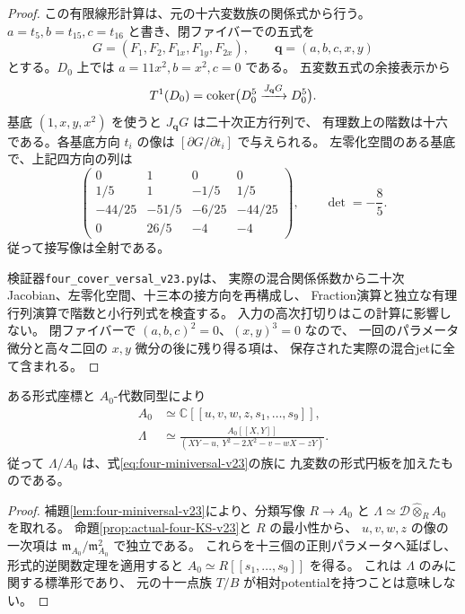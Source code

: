 \begin{proof}
この有限線形計算は、元の十六変数族の関係式から行う。
$a=t_5,b=t_{15},c=t_{16}$ と書き、閉ファイバーでの五式を
\[
 G=(F_1,F_2,F_{1x},F_{1y},F_{2x}),\qquad
 \mathbf q=(a,b,c,x,y)
\]
とする。$D_0$ 上では
$a=11x^2,b=x^2,c=0$ である。
五変数五式の余接表示から
\[
 T^1(D_0)=\operatorname{coker}\bigl(D_0^5\xrightarrow{J_{\mathbf q}G}D_0^5\bigr).
\]
基底 $(1,x,y,x^2)$ を使うと $J_{\mathbf q}G$ は二十次正方行列で、
有理数上の階数は十六である。各基底方向 $t_i$ の像は
$[\partial G/\partial t_i]$ で与えられる。
左零化空間のある基底で、上記四方向の列は
\[
 \begin{pmatrix}
 0&1&0&0\\
 1/5&1&-1/5&1/5\\
 -44/25&-51/5&-6/25&-44/25\\
 0&26/5&-4&-4
 \end{pmatrix},
 \qquad \det=-\frac85.
\]
従って接写像は全射である。

検証器\nolinkurl{four_cover_versal_v23.py}は、
実際の混合関係係数から二十次Jacobian、左零化空間、十三本の接方向を再構成し、
Fraction演算と独立な有理行列演算で階数と小行列式を検査する。
入力の高次打切りはこの計算に影響しない。
閉ファイバーで $(a,b,c)^2=0$、$(x,y)^3=0$ なので、
一回のパラメータ微分と高々二回の $x,y$ 微分の後に残り得る項は、
保存された実際の混合jetに全て含まれる。
\end{proof}

\begin{theorem}[四枚被覆の標準形]\label{thm:four-normal-form-v23}
ある形式座標と $A_0$-代数同型により
\begin{align}
 A_0&\simeq\mathbb C[[u,v,w,z,s_1,\ldots,s_9]],\\
 \Lambda&\simeq
 \frac{A_0[[X,Y]]}{(XY-u,\ Y^2-2X^2-v-wX-zY)}.
 \label{eq:actual-four-normal-form-v23}
\end{align}
従って $\Lambda/A_0$ は、式\eqref{eq:four-miniversal-v23}の族に
九変数の形式円板を加えたものである。
\end{theorem}

\begin{proof}
補題\ref{lem:four-miniversal-v23}により、分類写像 $R\to A_0$ と
$\Lambda\simeq\mathscr D\widehat\otimes_R A_0$ を取れる。
命題\ref{prop:actual-four-KS-v23}と $R$ の最小性から、
$u,v,w,z$ の像の一次項は $\mathfrak m_{A_0}/\mathfrak m_{A_0}^2$ で独立である。
これらを十三個の正則パラメータへ延ばし、形式的逆関数定理を適用すると
$A_0\simeq R[[s_1,\ldots,s_9]]$ を得る。
これは $\Lambda$ のみに関する標準形であり、
元の十一点族 $T/B$ が相対potentialを持つことは意味しない。
\end{proof}

